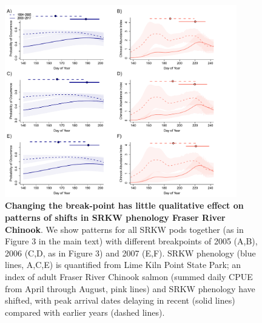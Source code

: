 \documentclass{article}
\begin{document}
\newpage
\begin{figure}[!hp]
\includegraphics[width=0.9\textwidth]{../analyses/orcaphen/figures/orcachinphenoverlapSRallbrkyears.pdf}
\caption{\textbf{Changing the break-point has little qualitative effect on patterns of shifts in SRKW phenology Fraser River Chinook}. We show patterns for all SRKW pods together (as in Figure 3 in the main text) with different breakpoints of 2005 (A,B), 2006 (C,D, as in Figure 3) and 2007 (E,F). SRKW phenology (blue lines, A,C,E) is quantified from Lime Kiln Point State Park; an index of adult Fraser River Chinook salmon (summed daily CPUE from April through August, pink lines) and SRKW phenology have shifted, with peak arrival dates delaying in recent (solid lines) compared with earlier years (dashed lines).}
\label{fig:brkpt}
\end{figure}
\end{document}
